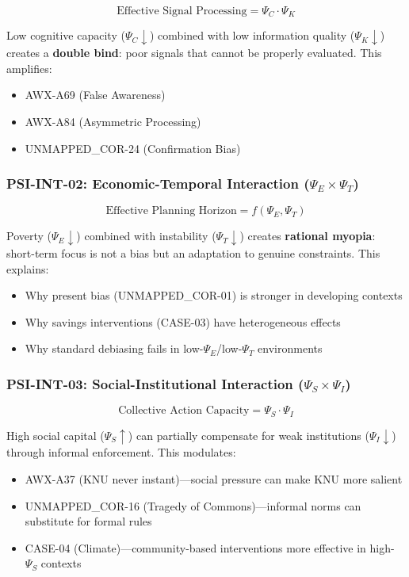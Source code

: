 \begin{equation}
\text{Effective Signal Processing} = \Psi_C \cdot \Psi_K
\end{equation}

Low cognitive capacity ($\Psi_C \downarrow$) combined with low information quality ($\Psi_K \downarrow$) creates a \textbf{double bind}: poor signals that cannot be properly evaluated. This amplifies:
\begin{itemize}
    \item AWX-A69 (False Awareness)
    \item AWX-A84 (Asymmetric Processing)
    \item UNMAPPED_COR-24 (Confirmation Bias)
\end{itemize}

\subsubsection{PSI-INT-02: Economic-Temporal Interaction ($\Psi_E \times \Psi_T$)}

\begin{equation}
\text{Effective Planning Horizon} = f(\Psi_E, \Psi_T)
\end{equation}

Poverty ($\Psi_E \downarrow$) combined with instability ($\Psi_T \downarrow$) creates \textbf{rational myopia}: short-term focus is not a bias but an adaptation to genuine constraints. This explains:
\begin{itemize}
    \item Why present bias (UNMAPPED_COR-01) is stronger in developing contexts
    \item Why savings interventions (CASE-03) have heterogeneous effects
    \item Why standard debiasing fails in low-$\Psi_E$/low-$\Psi_T$ environments
\end{itemize}

\subsubsection{PSI-INT-03: Social-Institutional Interaction ($\Psi_S \times \Psi_I$)}

\begin{equation}
\text{Collective Action Capacity} = \Psi_S \cdot \Psi_I
\end{equation}

High social capital ($\Psi_S \uparrow$) can partially compensate for weak institutions ($\Psi_I \downarrow$) through informal enforcement. This modulates:
\begin{itemize}
    \item AWX-A37 (KNU never instant)---social pressure can make KNU more salient
    \item UNMAPPED_COR-16 (Tragedy of Commons)---informal norms can substitute for formal rules
    \item CASE-04 (Climate)---community-based interventions more effective in high-$\Psi_S$ contexts
\end{itemize}

